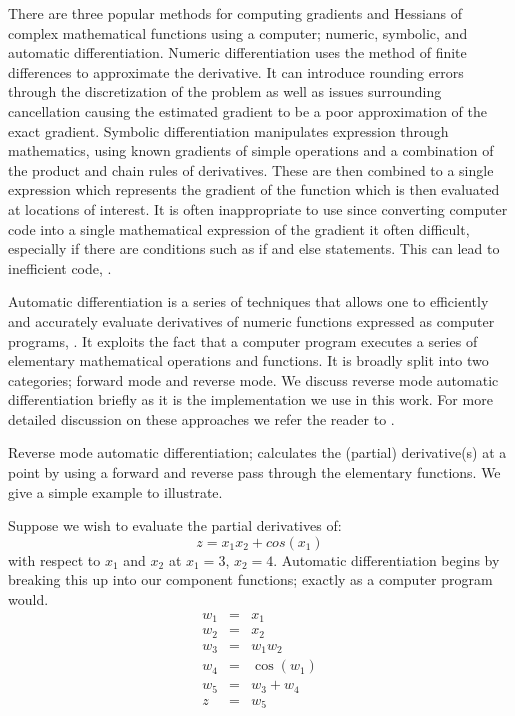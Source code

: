 There are three popular methods for computing gradients and Hessians of complex mathematical functions using a computer; numeric, symbolic, and automatic differentiation.
Numeric differentiation uses the method of finite differences to approximate the derivative.
It can introduce rounding errors through the discretization of the problem as well as issues surrounding cancellation causing the estimated gradient to be a poor approximation of the exact gradient.
Symbolic differentiation manipulates expression through mathematics, using known gradients of simple operations and a combination of the product and chain rules of derivatives.
These are then combined to a single expression which represents the gradient of the function which is then evaluated at locations of interest.
It is often inappropriate to use since converting computer code into a single mathematical expression of the gradient it often difficult, especially if there are conditions such as if and else statements. 
This can lead to inefficient code, \citep{baydin_automatic_2018}.

Automatic differentiation is a series of techniques that allows one to efficiently and accurately evaluate derivatives of numeric functions expressed as computer programs, \citep{neidinger_introduction_2010}.
It exploits the fact that a computer program executes a series of elementary mathematical operations and functions.
It is broadly split into two categories; forward mode and reverse mode.
We discuss reverse mode automatic differentiation briefly as it is the implementation we use in this work.
For more detailed discussion on these approaches we refer the reader to \citep{neidinger_introduction_2010}.

Reverse mode automatic differentiation; calculates the (partial) derivative(s) at a point by using a forward and reverse pass through the elementary functions.
We give a simple example to illustrate.

Suppose we wish to evaluate the partial derivatives of:
\begin{equation}
	z = x_1 x_2 + cos(x_1)
\end{equation}
with respect to $x_1$ and $x_2$ at $x_1=3$, $x_2=4$.
Automatic differentiation begins by breaking this up into our component functions; exactly as a computer program would. 
\begin{eqnarray*}
	w_1 &=& x_1 \\
	w_2 &=& x_2 \\
	w_3 &=& w_1 w_2 \\
	w_4 &=& \cos\left(w_1\right) \\
	w_5 &=& w_3 + w_4 \\
	z &=& w_5
\end{eqnarray*}


